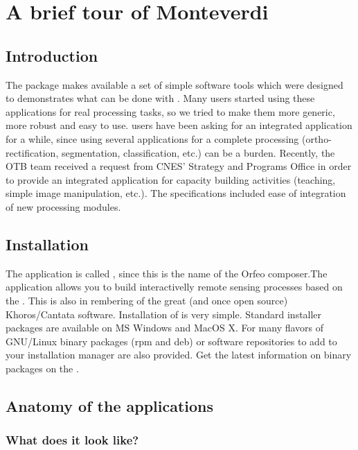 \chapter{A brief tour of Monteverdi}\label{chap:Monteverdi} 

\section{Introduction}\label{sec:montintro}
The \app package makes available a set of simple software
tools which were designed to demonstrates what can be done with
\otb. Many users started using these applications for real processing
tasks, so we tried to make them more generic, more robust and easy to
use. \otb users have been asking for an integrated application for a
while, since using several applications for a complete processing
(ortho-rectification, segmentation, classification, etc.) can be a
burden. Recently, the OTB team received a request from CNES' Strategy
and Programs Office in order to provide an integrated application for
capacity building activities (teaching, simple image manipulation,
etc.). The specifications included ease of integration of new
processing modules.  

\section{Installation}\label{sec:montinstall} 
The application is called \mont, since this is the name of the Orfeo
composer.The application allows you to build interactivelly remote
sensing processes based on the \otb. This is also in
rembering of the great (and once open source) Khoros/Cantata
software.  Installation of \mont is very simple. Standard
installer packages are available on MS Windows and MacOS X.  For many
flavors of GNU/Linux binary packages (rpm and deb) or software
repositories to add to your installation manager are also provided. 
Get the latest information on binary packages on the \website.

\section{Anatomy of the applications}\label{sec:anatomy}

\subsection{What does it look like?}

